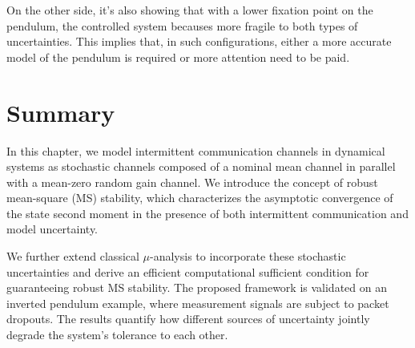 On the other side, it's also showing that with a lower fixation point on the pendulum, the controlled system becauses more fragile to both types of uncertainties. This implies that, in such configurations, either a more accurate model of the pendulum is required or more attention need to be paid.





\section{Summary}
In this chapter, we model intermittent communication channels in dynamical systems as stochastic channels composed of a nominal mean channel in parallel with a mean-zero random gain channel. 
We introduce the concept of robust mean-square (MS) stability, which characterizes the asymptotic convergence of the state second moment in the presence of both intermittent communication and model uncertainty.  

We further extend classical $\mu$-analysis to incorporate these stochastic uncertainties and derive an efficient computational sufficient condition for guaranteeing robust MS stability. 
The proposed framework is validated on an inverted pendulum example, where measurement signals are subject to packet dropouts. 
The results quantify how different sources of uncertainty jointly degrade the system’s tolerance to each other.






